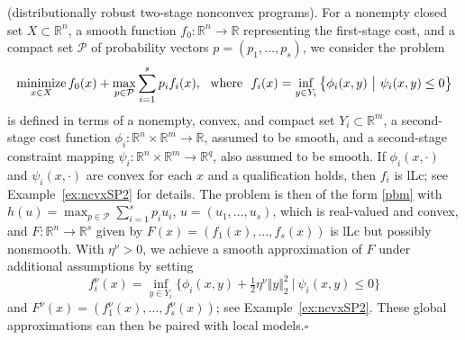 \documentclass[smallextended,envcountsect]{svjour3}
\newcommand{\norm}[1]{\textstyle{\Vert} #1 \textstyle{\Vert}_2}
\newcommand{\inner}[2]{\langle#1,#2\rangle}
\renewcommand{\Re}{\mathbb{R}}
\newcommand{\mybox}{{\hfill $\square$}}
\newcommand{\reals}{\mathbb{R}}
\newcommand{\nnmin}{\mathop{\rm minimize}}
\begin{document}
\begin{example}{\rm (distributionally robust two-stage nonconvex programs).}\label{ex:ncvxSP} For a nonempty closed set $X \subset \Re^n$, a smooth function $f_0:\reals^n\to \reals$ representing the first-stage cost, and a compact set $\mathcal{P}$ of probability vectors $p = (p_1, \dots, p_s)$, we consider the problem
\[
\nnmin_{x\in X}  f_0(x) + \max_{p\in \mathcal{P}} \displaystyle \sum_{i=1}^s p_i f_i(x), ~~\text{where} ~~
f_i(x) = \inf_{y \in Y_i}\big\{ \phi_i(x,y)~\big|~ \psi_{i}(x,y)\leq 0 \big\}
\]
is defined in terms of a nonempty, convex, and compact set $Y_i \subset \Re^{m}$, a second-stage cost function $\phi_i:\Re^n\times \Re^m \to \Re$, assumed to be smooth, and a second-stage constraint mapping $\psi_{i}:\Re^n\times \Re^m \to \Re^{q}$, also assumed to be smooth. If $\phi_i(x,\cdot)$ and $\psi_{i}(x,\cdot)$ are convex for each $x$ and a qualification holds, then $f_i$ is lLc; see Example~\ref{ex:ncvxSP2} for details. 
The problem is then of the form \eqref{pbm} with $h(u)=\max_{p\in \mathcal{P}} \sum_{i=1}^s p_i u_i$,  $u=(u_1,\ldots,u_s)$, which is real-valued and convex, and $F:\Re^n \to \Re^{s}$ given by $F(x) = (f_1(x),\ldots,f_s(x))$ is lLc but possibly nonsmooth.  
With $\eta^\nu>0$, we achieve a smooth approximation of $F$ under additional assumptions by setting 
\[
f^\nu_i(x)= \inf_{y \in Y_i} \big\{ \phi_i(x,y) + \tfrac{1}{2}\eta^\nu\norm{y}^2~\big|~\psi_{i}(x,y)\leq 0\big\}
\]
and $F^\nu(x)=(f_1^\nu(x),\ldots,f_s^\nu(x))$; see Example~\ref{ex:ncvxSP2}. These global approximations can then be paired with local models.\mybox
\end{example}
\end{document}
